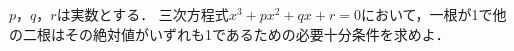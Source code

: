 \documentclass[../../main.tex]{subfiles}
\begin{document}
$p$，$q$，$r$は実数とする．
三次方程式$x^3+px^2+qx+r=0$において，一根が1で他の二根はその絶対値がいずれも1であるための必要十分条件を求めよ．
\end{document}
